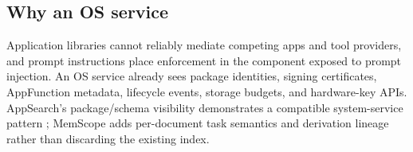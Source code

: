 \subsection{Why an OS service}

Application libraries cannot reliably mediate competing apps and tool providers, and prompt instructions place enforcement in the component exposed to prompt injection. An OS service already sees package identities, signing certificates, AppFunction metadata, lifecycle events, storage budgets, and hardware-key APIs. AppSearch's package/schema visibility demonstrates a compatible system-service pattern \citep{android2026visibility}; MemScope adds per-document task semantics and derivation lineage rather than discarding the existing index.
